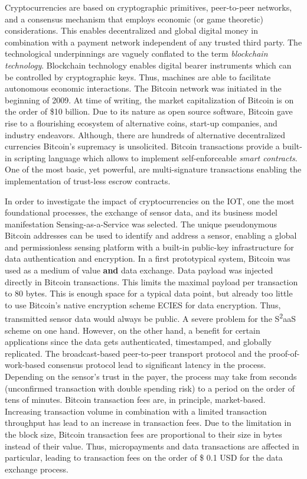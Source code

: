 Cryptocurrencies are based on cryptographic primitives, peer-to-peer networks, and a consensus mechanism that employs economic (or game theoretic) considerations. This enables decentralized and global digital money in combination with a payment network independent of any trusted third party. The technological underpinnings are vaguely conflated to the term \emph{blockchain technology}. Blockchain technology enables digital bearer instruments which can be controlled by cryptographic keys. Thus, machines are able to facilitate autonomous economic interactions. 
The Bitcoin network was initiated in the beginning of 2009. At time of writing, the market capitalization of Bitcoin is on the order of \$10 billion. Due to its nature as open source software, Bitcoin gave rise to a flourishing ecosystem of alternative coins, start-up companies, and industry endeavors. Although, there are hundreds of alternative decentralized currencies Bitcoin's supremacy is unsolicited. Bitcoin transactions provide a built-in scripting language which allows to implement self-enforceable \emph{smart contracts}. One of the most basic, yet powerful, are multi-signature transactions enabling the implementation of trust-less escrow contracts.

In order to investigate the impact of cryptocurrencies on the \ac{IOT}, one the most foundational processes, the exchange of sensor data, and its business model manifestation Sensing-as-a-Service was selected. The unique pseudonymous Bitcoin addresses can be used to identify and address a sensor, enabling a global and permissionless sensing platform with a built-in public-key infrastructure for data authentication and encryption. In a first prototypical system, Bitcoin was used as a medium of value \textbf{and} data exchange. Data payload was injected directly in Bitcoin transactions. This limits the maximal payload per transaction to 80 bytes. This is enough space for a typical data point, but already too little to use Bitcoin's native encryption scheme \ac{ECIES} for data encryption. Thus, transmitted sensor data would always be public. A severe problem for the S\textsuperscript{2}aaS scheme on one hand. However, on the other hand, a benefit for certain applications since the data gets authenticated, timestamped, and globally replicated. The broadcast-based peer-to-peer transport protocol and the proof-of-work-based consensus protocol lead to significant latency in the process. Depending on the sensor's trust in the payer, the process may take from seconds (unconfirmed transaction with double spending risk) to a period on the order of tens of minutes. Bitcoin transaction fees are, in principle, market-based. Increasing transaction volume in combination with a limited transaction throughput has lead to an increase in transaction fees. Due to the limitation in the block size, Bitcoin transaction fees are proportional to their size in bytes instead of their value. Thus, micropayments and data transactions are affected in particular, leading to transaction fees on the order of \$ 0.1 USD for the data exchange process. 


